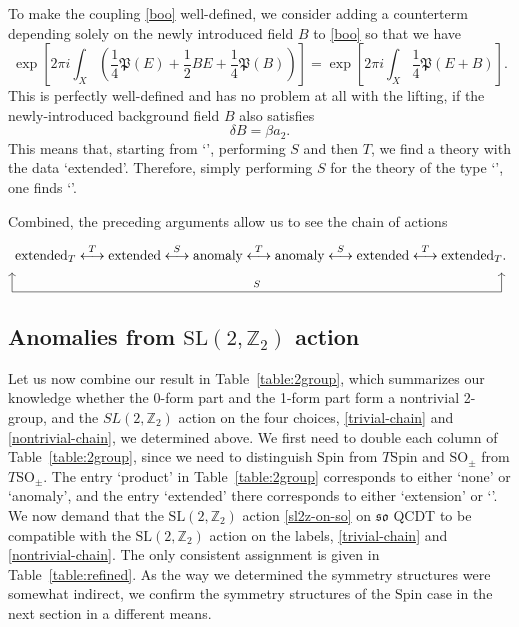\documentclass[12pt]{article}
\numberwithin{equation}{section}
\def\bZ{\mathbb{Z}}
\def\fP{\mathfrak{P}}
\def\SO{\mathrm{SO}}
\def\so{\mathfrak{so}}
\def\Spin{\mathrm{Spin}}
\def\SL{\mathrm{SL}}
\begin{document}
To make  the coupling \eqref{boo}  well-defined, we consider adding a counterterm depending solely on the newly introduced field $B$ to \eqref{boo} so that we have \begin{equation}
\exp\left[2\pi i\int_X \left( \frac14 \fP(E) +\frac12 B E + \frac14 \fP(B) \right)\right]
= 
\exp \left[2\pi i \int_X \frac14 \fP(E+B)\right] .
\end{equation}
This is perfectly well-defined and has no problem at all with the lifting,
if the newly-introduced background field $B$  also satisfies \begin{equation}
\delta B=\beta a_2.
\end{equation}
This means that, starting from `\Textended', performing $S$ and then $T$, we find a theory with the data `extended'.
Therefore, simply performing $S$ for the theory of the type `\Textended',  one  finds `\Textended'.

Combined, the preceding arguments allow us to see the chain of actions \begin{equation}
\begin{tikzpicture}
	\node at (0,0) {$
		\text{\Textended} \stackrel{T}{\longleftrightarrow} 
		\text{extended} \stackrel{S}{\longleftrightarrow} 
		\text{anomaly} \stackrel{T}{\longleftrightarrow} 
		\text{anomaly} \stackrel{S}{\longleftrightarrow} 
		\text{extended}\stackrel{T}{\longleftrightarrow} 
		\text{\Textended}.
	$};
	\draw[->] (-6.5,-1) -- (-6.5,-0.5);
	\draw[->] (6.3,-1) -- (6.3,-0.5);
	\draw (-6.5,-1) -- node[above] {\scriptsize $S$} (6.3,-1);
\end{tikzpicture}
\label{nontrivial-chain}
\end{equation}


\subsection{Anomalies from $\SL(2,\bZ_2)$ action} 

Let us now combine our result in Table~\ref{table:2group},
which summarizes our knowledge whether the 0-form part and the 1-form part form a nontrivial 2-group,
and the $SL(2,\bZ_2)$ action on the four choices, \eqref{trivial-chain} and \eqref{nontrivial-chain}, we determined above.
We first need to double each column of Table~\ref{table:2group},
since we need to distinguish $\Spin$ from $T\Spin$ and $\SO_\pm$ from $T\SO_\pm$.
The entry `product' in Table~\ref{table:2group} corresponds to either `none' or `anomaly',
and the entry `extended' there corresponds to either `extension' or `\Textended'.
We now demand that the $\SL(2,\bZ_2)$ action \eqref{sl2z-on-so} on $\so$ QCDT to be compatible with the $\SL(2,\bZ_2)$ action on the labels, \eqref{trivial-chain} and \eqref{nontrivial-chain}.
The only consistent assignment is given in Table~\ref{table:refined}.
As the way we determined the symmetry structures were somewhat indirect,
we confirm the symmetry structures of the $\Spin$ case in the next section
in a different means.
\end{document}

